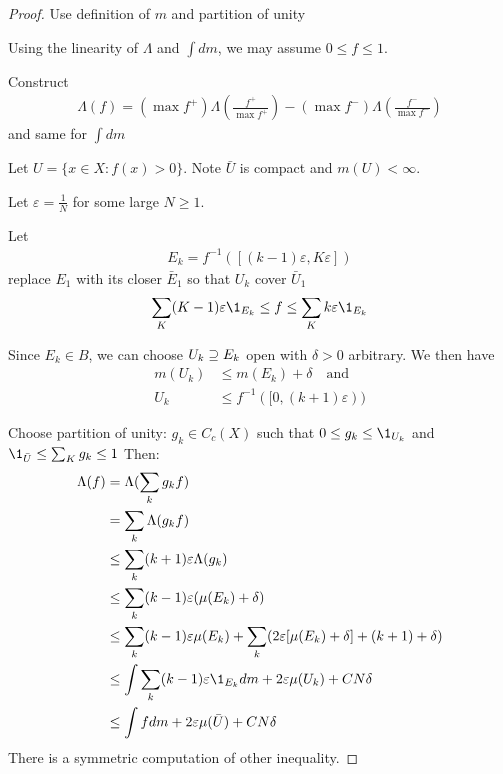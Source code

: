 \begin{proof}
	Use definition of $m$ and partition of unity

	Using the linearity of $\Lambda$ and  $\int dm$, we may assume $0 \leq f \leq 1.$

	Construct
	 \begin{align*}
	    \Lambda (f) = ( \max f^+ ) \Lambda \left(\frac{f^+}{\max f^+}\right) - (\max f^- ) \Lambda \left(\frac{f^-}{\max f^-} \right)
	\end{align*}
	and same for $\int dm$


	Let $U = \{x \in X : f(x) > 0\}$. Note  $\bar{U}$ is compact and $m(U) < \infty$.

	Let  $\varepsilon = \frac{1}{N}$ for some large  $N \geq 1$.

	Let
	\begin{align*}
		E_k = f^{-1}\left( [ (k-1) \varepsilon, K \varepsilon]\right)
	\end{align*}
	replace $E_1$ with its closer $\bar{E}_1$ so that $U_k$ cover $\bar{U}_1$
	 \begin{align*}
	\sum_{K} (K -1) \varepsilon \1_{E_k} \leq f \leq \sum_{K} k \varepsilon \1_{E_k}
	\end{align*}

	Since $E_k \in B$, we can choose $U_k \supseteq E_k$ open with $\delta >0 $ arbitrary.
	We then have
	\begin{align*}
		m(U_k) &\leq m(E_k) + \delta \quad \text{and} \\
		U_k &\leq f^{-1} ( [ 0, (k+1)\varepsilon))
	\end{align*}

	Choose partition of unity: $g_k \in C_c(X)$ such that  $0 \leq g_k \leq \1_{U_k}$ and \\
	$\1_{\bar{U}} \leq \sum_{K} g_k \leq 1$
	Then:
	\begin{align*}
	\Lambda(f) &= \Lambda( \sum_{k} g_k f) \\
			   &=  \sum_{k} \Lambda( g_k f) \\
			   &\leq  \sum_{k} (k+1) \varepsilon \Lambda( g_k ) \\
			   &\leq  \sum_{k} (k-1) \varepsilon ( \mu( E_k ) + \delta ) \\
			   &\leq \sum_{k} (k-1) \varepsilon \mu( E_k ) + \sum_{k} (2 \varepsilon [ \mu (E_k) + \delta] + (k+1) + \delta) \\
			   &\leq \int \sum_{k} (k-1) \varepsilon \1_{E_k} dm + 2 \varepsilon  \mu( U_k ) + C N \delta  \\
			   &\leq \int f dm + 2 \varepsilon  \mu(\bar{U}) + C N \delta  \\
	\end{align*} There is a symmetric computation of other inequality.
\end{proof}




